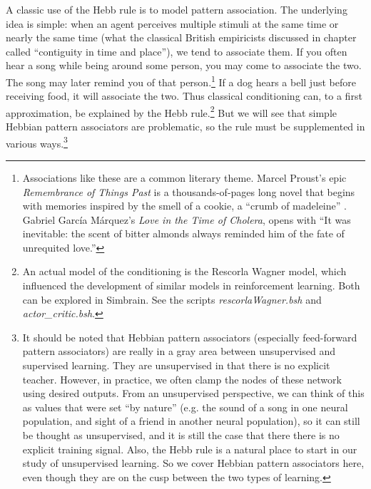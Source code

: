 A classic use of the Hebb rule is to model pattern association. The underlying idea is simple: when an agent perceives multiple stimuli at the same time or nearly the same time (what the classical British empiricists discussed in chapter  called ``contiguity in time and place''), we tend to associate them. If you often hear a song while being around some person, you may come to associate the two. The song may later remind you of that person.\footnote{Associations like these are a common literary theme. Marcel Proust's epic \emph{Remembrance of Things Past} is a thousands-of-pages long novel that begins with memories inspired by the smell of a cookie, a ``crumb of madeleine'' \cite{proust2006remembrance}. Gabriel Garc\'{i}a M\'{a}rquez's \emph{Love in the Time of Cholera}, opens with ``It was inevitable: the scent of bitter almonds always reminded him of the fate of unrequited love.''}  If a dog hears a bell just before receiving food, it will associate the two. Thus classical conditioning can, to a first approximation, be explained by the Hebb rule.\footnote{\label{hebb_updated}An actual model of the conditioning is the Rescorla Wagner model, which influenced the development of similar models in reinforcement learning. Both can be explored in Simbrain. See the scripts \emph{rescorlaWagner.bsh} and \emph{actor\_critic.bsh}.}   But we will see that simple Hebbian pattern associators are problematic, so the rule must be supplemented in various ways.\footnote{\label{grayArea} It should be noted that Hebbian pattern associators (especially feed-forward pattern associators) are really in a gray area between unsupervised and supervised learning. They are unsupervised in that there is no explicit teacher. However, in practice, we often clamp the nodes of these network using desired outputs. From an unsupervised perspective, we can think of this as values that were set ``by nature'' (e.g. the sound of a song in one neural population, and sight of a friend in another neural population), so it can still be thought as unsupervised, and it is still the case that there there is no explicit training signal. Also, the Hebb rule is a natural place to start in our study of unsupervised learning. So we cover Hebbian pattern associators here, even though they are on the cusp between the two types of learning.}


